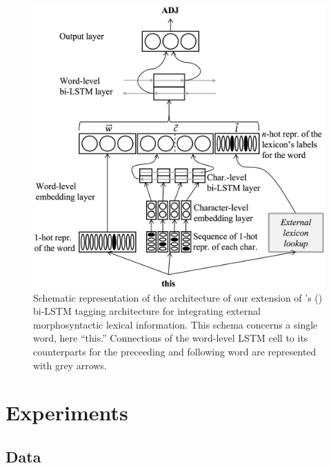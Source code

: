 \documentclass[11pt,letterpaper]{article}
\begin{document}
\begin{figure}
\includegraphics[width=\columnwidth]{emnlp17schemaB2}
\caption{Schematic representation of the architecture of our extension of \citeauthor{plank16}'s (\citeyear{plank16})
  bi-LSTM tagging architecture for integrating external morphosyntactic lexical information. This schema concerns a
  single word, here ``this.'' Connections of the word-level LSTM cell to its counterparts for the preceeding and
  following word are represented with grey arrows.}\label{fig:schema}
\end{figure}

\section{Experiments}

\subsection{Data}
\end{document}

